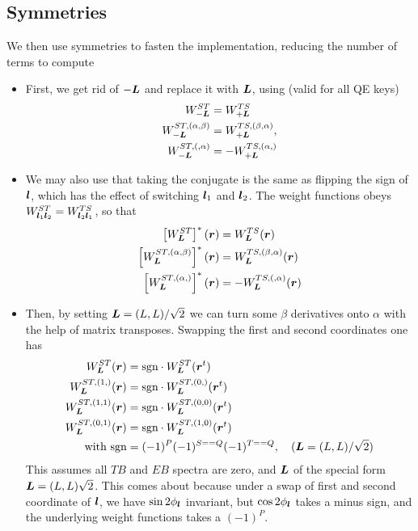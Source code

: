 \documentclass[11pt]{article}
\begin{document}
\subsection{Symmetries}
We then use symmetries to fasten the implementation, reducing the number of terms to compute
\begin{itemize}
	\item First, we get rid of $-\boldsymbol{L}$ and replace it with $\boldsymbol{L}$, using (valid for all QE keys)
\begin{equation}
\begin{split}
  W_{-\boldsymbol{L}}^{ST} &= W_{+\boldsymbol{L}}^{TS}\\
	W_{-\boldsymbol{L}}^{ST, (\alpha,\beta)} &= W_{+\boldsymbol{L}}^{TS, (\beta,\alpha)}, \\
	W_{-\boldsymbol{L}}^{ST, (,\alpha)} &= -W_{+\boldsymbol{L}}^{TS, (\alpha,)} \\
	\end{split}
	\end{equation}
\item We may also use that taking the conjugate is the same as flipping the sign of $\boldsymbol{l}$, which has the effect of switching $\boldsymbol{l}_1$ and $\boldsymbol{l}_2$. The weight functions obeys $W^{ST}_{\boldsymbol{l}_1\boldsymbol{l}_2} = W_{\boldsymbol{l}_2\boldsymbol{l}_1}^{TS}$, so that
\begin{equation}
\begin{split}
	\left[W_{\boldsymbol{L}}^{ST}\right]^*(\boldsymbol{r}) &= W_{\boldsymbol{L}}^{TS}(\boldsymbol{r}) \\
	\left[W_{\boldsymbol{L}}^{ST, (\alpha, \beta)}\right]^*(\boldsymbol{r}) &= W_{\boldsymbol{L}}^{TS, (\beta, \alpha)}(\boldsymbol{r}) \\
		\left[W_{\boldsymbol{L}}^{ST, (\alpha,)}\right]^*(\boldsymbol{r}) &= -W_{\boldsymbol{L}}^{TS, (, \alpha)}(\boldsymbol{r}) \\
\end{split}
\end{equation}
\item Then, by setting $\boldsymbol{L} = (L,L)/\sqrt{2}$ we can turn some $\beta$ derivatives onto $\alpha$ with the help of matrix transposes. Swapping the first and second coordinates one has
\begin{equation}
\begin{split}
	W_{\boldsymbol{L}}^{ST}(\boldsymbol{r})& = \textrm{sgn}\cdot W^{ST}_{\boldsymbol{L}}({\boldsymbol{r}}^t) \\
	W_{\boldsymbol{L}}^{ST, (1,)}(\boldsymbol{r})& = \textrm{sgn}\cdot  W_{\boldsymbol{L}}^{ST, (0,)}(\boldsymbol{r}^t) \\
		W_{\boldsymbol{L}}^{ST, (1, 1)}(\boldsymbol{r})& = \textrm{sgn}\cdot  W_{\boldsymbol{L}}^{ST, (0,0)}(\boldsymbol{r}^t) \\
				W_{\boldsymbol{L}}^{ST, (0,1)}(\boldsymbol{r})& = \textrm{sgn}\cdot  W_{\boldsymbol{L}}^{ST, (1,0)}(\boldsymbol{r}^t) \\
		\textrm{ with sgn} &= (-1)^P (-1)^{S == Q} (-1)^{T == Q},\quad  (\boldsymbol{L} = (L,L)/\sqrt{2})\end{split}
\end{equation}
This assumes all $TB$ and $EB$ spectra are zero, and $\boldsymbol{L}$ of the special form   $\boldsymbol{L} = (L,L)\sqrt{2}$. This comes about because under a swap of first and second coordinate of $\boldsymbol{l}$, we have $\sin 2\phi_{\boldsymbol{l}}$ invariant, but $\cos 2\phi_{\boldsymbol{l}}$ takes a minus sign, and the underlying weight functions takes a $(-1)^P$.
\end{itemize}
\end{document}
